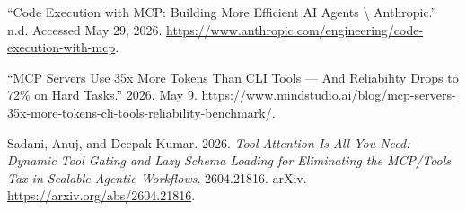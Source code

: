 \documentclass[
  letterpaper,
  DIV=11,
  numbers=noendperiod]{scrartcl}
\newlength{\cslhangindent}
\newenvironment{CSLReferences}[2] %
 {\begin{list}{}{%
  \setlength{\itemindent}{0pt}
  \setlength{\leftmargin}{0pt}
  \setlength{\parsep}{0pt}
  \ifodd #1
   \setlength{\leftmargin}{\cslhangindent}
   \setlength{\itemindent}{-1\cslhangindent}
  \fi
  \setlength{\itemsep}{#2\baselineskip}}}
 {\end{list}}
\begin{document}
\protect{}\label{refs}
\begin{CSLReferences}{1}{1}
{``Code Execution with {MCP:} Building More Efficient {AI} Agents
\textbackslash{} {Anthropic}.''} n.d. Accessed May 29, 2026.
\url{https://www.anthropic.com/engineering/code-execution-with-mcp}.

{``MCP {Servers} {Use} 35x {More} {Tokens} {Than} {CLI} {Tools} ---
{And} {Reliability} {Drops} to 72\% on {Hard} {Tasks}.''} 2026. May 9.
\url{https://www.mindstudio.ai/blog/mcp-servers-35x-more-tokens-cli-tools-reliability-benchmark/}.

Sadani, Anuj, and Deepak Kumar. 2026. \emph{Tool {Attention} {Is} {All}
{You} {Need:} {Dynamic} {Tool} {Gating} and {Lazy} {Schema} {Loading}
for {Eliminating} the {MCP/Tools} {Tax} in {Scalable} {Agentic}
{Workflows}}. 2604.21816. arXiv. \url{https://arxiv.org/abs/2604.21816}.

\end{CSLReferences}
\end{document}
